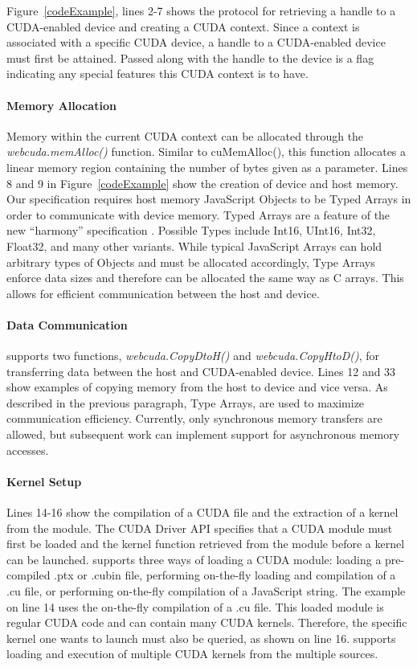 Figure~\ref{codeExample}, lines 2-7 shows the protocol for
retrieving a handle to a CUDA-enabled device and creating a CUDA context. Since
a context is associated with a specific CUDA device, a handle to a CUDA-enabled
device must first be attained. Passed along with the handle to the device is a
flag indicating any special features this CUDA context is to have.

\paragraph{Memory Allocation} Memory within the current CUDA context can be
allocated through the \textit{webcuda.memAlloc()} function. Similar to
cuMemAlloc(), this function allocates a linear memory region containing the
number of bytes given as a parameter. Lines 8 and 9 in Figure~\ref{codeExample}
show the creation of device and host memory.  Our specification requires host
memory JavaScript Objects to be Typed Arrays \cite{typedarray} in order to communicate
with device memory. Typed Arrays are a feature of the new ``harmony''
specification \cite{harmony}. Possible Types include Int16, UInt16, Int32, Float32, and many
other variants. While typical JavaScript Arrays can hold arbitrary types of Objects and must be
allocated accordingly, Type Arrays enforce data sizes and therefore can be
allocated the same way as C arrays. This allows for efficient communication
between the host and device.


\paragraph{Data Communication} \name supports two functions,
\textit{webcuda.CopyDtoH()} and \textit{webcuda.CopyHtoD()}, for transferring
data between the host and CUDA-enabled device. Lines 12 and 33 show examples of
copying memory from the host to device and vice versa. As described in the
previous paragraph, Type Arrays, are used to maximize
communication efficiency. Currently, only synchronous memory transfers are
allowed, but subsequent work can implement support for asynchronous memory
accesses.

\paragraph{Kernel Setup} Lines 14-16 show the compilation of a CUDA file and the
extraction of a kernel from the module. The CUDA Driver API specifies that a
CUDA module must first be loaded and the kernel function retrieved from the
module before a kernel can be launched. \name supports three ways of loading a
CUDA module: loading a pre-compiled .ptx or .cubin file, performing on-the-fly
loading and compilation of a .cu file, or performing on-the-fly compilation of a
JavaScript string.  The example on line 14 uses the on-the-fly compilation of a
.cu file. This loaded module is regular CUDA code and can contain many CUDA
kernels.  Therefore, the specific kernel one wants to launch must also be
queried, as shown on line 16. \name supports loading and execution of
multiple CUDA kernels from the multiple sources.

